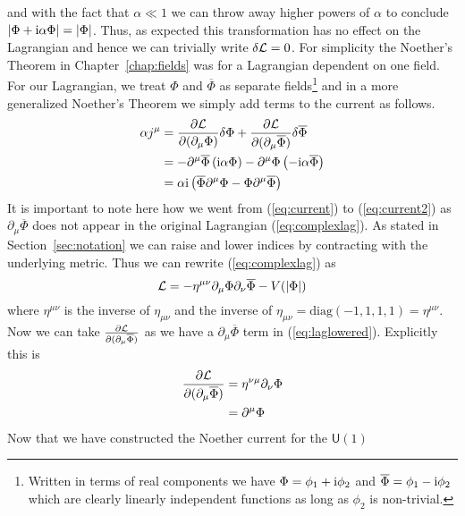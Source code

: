 and with the fact that \(\alpha \ll 1\) we can throw away higher powers of
\(\alpha\) to conclude \(|\Phi + \mathrm{i}\alpha\Phi| = |\Phi|\). Thus, as expected
this transformation has no effect on the Lagrangian and hence we can trivially
write \(\delta\mathcal{L} = 0\). For simplicity the Noether's Theorem in
Chapter~\ref{chap:fields} was for a Lagrangian dependent on one field. For our
Lagrangian, we treat \(\Phi\) and \(\overline{\Phi}\) as separate
fields\footnote{Written in terms of real components we have \(\Phi = \phi_1 + \mathrm{i}\phi_2\)
    and \(\overline{\Phi} = \phi_1 - \mathrm{i}\phi_2\) which are clearly linearly
    independent functions as long as \(\phi_2\) is non-trivial.} and in a more
generalized Noether's Theorem we simply add terms to the current as follows.
\begin{align}
    \alpha j^\mu & = \pdv{\mathcal{L}}{(\partial_\mu\Phi)}\delta\Phi + \pdv{\mathcal{L}}{(\partial_\mu\overline{\Phi})}\delta\overline{\Phi} \label{eq:current}        \\
                 & = -\partial^\mu\overline{\Phi}\left(\mathrm{i}\alpha\Phi\right) - \partial^\mu\Phi\left(-\mathrm{i}\alpha\overline{\Phi}\right) \label{eq:current2} \\
                 & = \alpha\mathrm{i}\left(\overline{\Phi}\partial^\mu\Phi - \Phi\partial^\mu\overline{\Phi}\right)
\end{align}
It is important to note here how we went from (\ref{eq:current}) to
(\ref{eq:current2}) as \(\partial_\mu\overline{\Phi}\) does not appear in the
original Lagrangian (\ref{eq:complexlag}). As stated in
Section~\ref{sec:notation} we can raise and lower indices by contracting with
the underlying metric. Thus we can rewrite (\ref{eq:complexlag}) as
\begin{equation}\label{eq:laglowered}
    \mathcal{L} = -\eta^{\mu\nu}\partial_\mu\Phi\partial_\nu\overline{\Phi} - V(|\Phi|)
\end{equation}
where \(\eta^{\mu\nu}\) is the inverse of \(\eta_{\mu\nu}\) and the inverse of
\(\eta_{\mu\nu} = \mathrm{diag}(-1,1,1,1) = \eta^{\mu\nu}\). Now we can take
\(\pdv{\mathcal{L}}{(\partial_\mu\overline{\Phi})}\) as we have a
\(\partial_\mu\overline{\Phi}\) term in (\ref{eq:laglowered}). Explicitly this
is
\begin{align}
    \pdv{\mathcal{L}}{(\partial_\mu\overline{\Phi})} & = \eta^{\nu\mu}\partial_\nu\Phi \\
                                              & = \partial^\mu\Phi
\end{align}
Now that we have constructed the Noether current for the \(\mathsf{U}(1)\)
